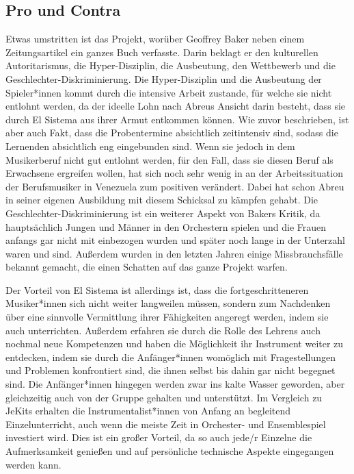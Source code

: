 \subsection{Pro und Contra}
Etwas umstritten ist das Projekt, worüber Geoffrey Baker neben einem
Zeitungsartikel ein ganzes Buch verfasste. Darin beklagt er den kulturellen
Autoritarismus, die Hyper-Disziplin, die Ausbeutung, den Wettbewerb und die
Geschlechter-Diskriminierung. Die Hyper-Disziplin und die Ausbeutung der
Spieler*innen kommt durch die intensive Arbeit zustande, für welche sie nicht
entlohnt werden, da der ideelle Lohn nach Abreus Ansicht darin besteht, dass sie
durch El Sistema aus ihrer Armut entkommen können. Wie zuvor beschrieben, ist
aber auch Fakt, dass die Probentermine absichtlich zeitintensiv sind, sodass die
Lernenden absichtlich eng eingebunden sind. Wenn sie jedoch in dem Musikerberuf
nicht gut entlohnt werden, für den Fall, dass sie diesen Beruf als Erwachsene
ergreifen wollen, hat sich noch sehr wenig in an der Arbeitssituation der
Berufsmusiker in Venezuela zum positiven verändert. Dabei hat schon Abreu in
seiner eigenen Ausbildung mit diesem Schicksal zu kämpfen gehabt. Die
Geschlechter-Diskriminierung ist ein weiterer Aspekt von Bakers Kritik, da
hauptsächlich Jungen und Männer in den Orchestern spielen und die Frauen anfangs
gar nicht mit einbezogen wurden und später noch lange in der Unterzahl waren und
sind. Außerdem wurden in den letzten Jahren einige Missbrauchsfälle bekannt
gemacht, die einen Schatten auf das ganze Projekt warfen. 

Der Vorteil von El Sistema ist allerdings ist, dass die fortgeschritteneren
Musiker*innen sich nicht weiter langweilen müssen, sondern zum Nachdenken über
eine sinnvolle Vermittlung ihrer Fähigkeiten angeregt werden, indem sie auch
unterrichten. Außerdem erfahren sie durch die Rolle des Lehrens auch nochmal
neue Kompetenzen und haben die Möglichkeit ihr Instrument weiter zu entdecken,
indem sie durch die Anfänger*innen womöglich mit Fragestellungen und Problemen
konfrontiert sind, die ihnen selbst bis dahin gar nicht begegnet sind. Die
Anfänger*innen hingegen werden zwar ins kalte Wasser geworden, aber gleichzeitig
auch von der Gruppe gehalten und unterstützt.
\autocite[160]{roebke_mantilla:vom_wilden_lernen}
Im Vergleich zu JeKits erhalten die Instrumentalist*innen von Anfang an
begleitend Einzelunterricht, auch wenn die meiste Zeit in Orchester- und
Ensemblespiel investiert wird. Dies ist ein großer Vorteil, da so auch jede/r
Einzelne die Aufmerksamkeit genießen und auf persönliche technische Aspekte
eingegangen werden kann. 

